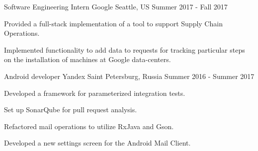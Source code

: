 \begin{cventries}
    \cventry
    {Software Engineering Intern} %
    {Google} %
    {Seattle, US} %
    {Summer 2017 - Fall 2017} %
    {
    \begin{cvitems} %
        \item {Provided a full-stack implementation of a tool to support Supply Chain Operations.}
        \item {Implemented functionality to add data to requests for tracking particular steps on the installation of machines at Google data-centers.
        }
    \end{cvitems}
    }

    \cventry
    {Android developer} %
    {Yandex} %
    {Saint Petersburg, Russia} %
    {Summer 2016 - Summer 2017} %
    {
    \begin{cvitems} %
        \item {Developed a framework for parameterized integration tests.}
        \item {Set up SonarQube for pull request analysis.}
        \item {Refactored mail operations to utilize RxJava and Gson.}
        \item {Developed a new settings screen for the Android Mail Client.}
    \end{cvitems}
    }
\end{cventries}
